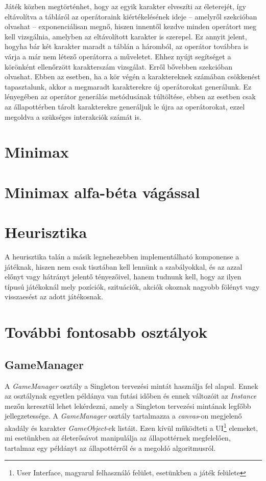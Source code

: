 \documentclass[
]{thesis-ekf}
\theoremstyle{definition}
\theoremstyle{remark}
\begin{document}
Játék közben megtörténhet, hogy az egyik karakter elveszíti az életerejét, így eltávolítva a tábláról az operátoraink kiértékelésének ideje -- amelyről  szekcióban olvashat -- exponenciálisan megnő, hiszen innentől kezdve minden operátort meg kell vizsgálnia, amelyben az eltávolított karakter is szerepel. Ez annyit jelent, hogyha bár két karakter maradt a táblán a háromból, az operátor továbbra is várja a már nem létező operátorra a műveletet. Ehhez nyújt segítséget a körönként ellenőrzött karakterszám vizsgálat. Erről bővebben  szekcióban olvashat. Ebben az esetben, ha a kör végén a karaktereknek számában csökkenést tapasztalunk, akkor a megmaradt karakterekre új operátorokat generálunk. Ez lényegében az operátor generálás metódusának túltöltése, ebben az esetben csak az állapottérben tárolt karakterekre generáljuk le újra az operátorokat, ezzel megoldva a szükséges interakciók számát is.

\section{Minimax} \label{minimax}

\section{Minimax alfa-béta vágással} \label{minimaxalphabeta}

\section{Heurisztika} \label{heuristics}

A heurisztika talán a másik legnehezebben implementálható komponense a játéknak, hiszen nem csak tisztában kell lennünk a szabályokkal, és az azzal előnyt vagy hátrányt jelentő tényezőivel, hanem tudnunk kell, hogy az ilyen típusú játékoknál mely pozíciók, szituációk, akciók okoznak nagyobb fölényt vagy visszaesést az adott játékosnak. 

\section{További fontosabb osztályok} 

\subsection{GameManager} \label{gamemanager}

A \emph{GameManager} osztály a Singleton tervezési mintát használja fel alapul. Ennek az osztálynak egyetlen példánya van futási időben és ennek változóit az \emph{Instance} mezőn keresztül lehet lekérdezni, amely a Singleton tervezési mintának legfőbb jellegzetessége. A \emph{GameManager} osztály tartalmazza a \emph{canvas}-on megjelenő akadály és karakter \emph{GameObject}-ek listáit. Ezen kívül működteti a UI\footnote{User Interface, magyarul felhasználó felület, esetünkben a játék felülete} elemeket, mi esetünkben az életerősávot manipulálja az állapottérnek megfelelően, tartalmaz egy példányt az állapottérről és a megoldó algoritmusról.
\end{document}
